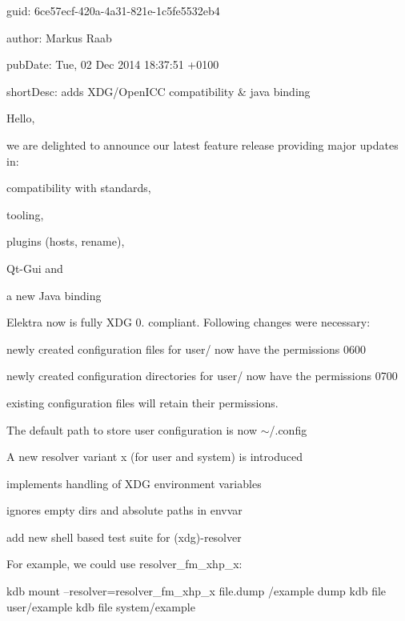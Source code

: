 
\begin{DoxyItemize}
\item guid\+: 6ce57ecf-\/420a-\/4a31-\/821e-\/1c5fe5532eb4
\item author\+: Markus Raab
\item pub\+Date\+: Tue, 02 Dec 2014 18\+:37\+:51 +0100
\item short\+Desc\+: adds X\+D\+G/\+Open\+I\+CC compatibility \& java binding
\end{DoxyItemize}

Hello,

we are delighted to announce our latest feature release providing major updates in\+:


\begin{DoxyItemize}
\item compatibility with standards,
\item tooling,
\item plugins (hosts, rename),
\item Qt-\/\+Gui and
\item a new Java binding
\end{DoxyItemize}

Elektra now is fully X\+DG 0. compliant. Following changes were necessary\+:


\begin{DoxyItemize}
\item newly created configuration files for user/ now have the permissions 0600
\item newly created configuration directories for user/ now have the permissions 0700
\item existing configuration files will retain their permissions.
\item The default path to store user configuration is now $\sim$/.config
\item A new resolver variant x (for user and system) is introduced
\begin{DoxyItemize}
\item implements handling of X\+DG environment variables
\item ignores empty dirs and absolute paths in envvar
\end{DoxyItemize}
\item add new shell based test suite for (xdg)-\/resolver
\end{DoxyItemize}

For example, we could use {\ttfamily resolver\+\_\+fm\+\_\+xhp\+\_\+x}\+: \begin{DoxyVerb}kdb mount --resolver=resolver_fm_xhp_x file.dump /example dump
kdb file user/example
kdb file system/example
\end{DoxyVerb}


